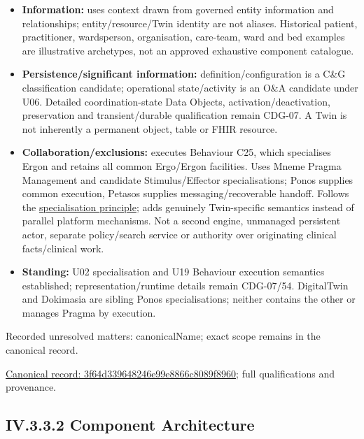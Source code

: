 \begin{itemize}
\item \textbf{Information:} uses context drawn from governed entity information and
  relationships; entity/resource/Twin identity are not aliases. Historical patient,
  practitioner, wardsperson, organisation, care-team, ward and bed examples are
  illustrative archetypes, not an approved exhaustive component catalogue.

\item \textbf{Persistence/significant information:} definition/configuration is a C\&G
  classification candidate; operational state/activity is an O\&A candidate under
  U06. Detailed coordination-state Data Objects, activation/deactivation,
  preservation and transient/durable qualification remain CDG-07. A Twin is not
  inherently a permanent object, table or FHIR resource.

\item \textbf{Collaboration/exclusions:} executes Behaviour C25, which specialises Ergon
  and retains all common Ergo/Ergon facilities. Uses Mneme Pragma Management and
  candidate Stimulus/Effector specialisations; Ponos supplies common execution,
  Petasos supplies messaging/recoverable handoff. Follows the
  \href{\detokenize{../../../../../docs/markdown/05-information-systems-architecture/README.md#specialisation-principle}}{specialisation principle}; adds genuinely
  Twin-specific semantics instead of parallel platform mechanisms.
  Not a second engine, unmanaged persistent actor, separate
  policy/search service or authority over originating clinical facts/clinical work.

\item \textbf{Standing:} U02 specialisation and U19 Behaviour execution semantics established;
  representation/runtime details remain CDG-07/54. DigitalTwin and Dokimasia are sibling
  Ponos specialisations; neither contains the other or manages Pragma by execution.

\end{itemize}

{\small Recorded unresolved matters: canonicalName; exact scope remains in the canonical record.}\par
{\footnotesize \href{../../../../continuum/application/application-component/3f64d339648246e99e8866c8089f8960.md}{Canonical record: 3f64d339648246e99e8866c8089f8960}; full qualifications and provenance.}\par
\subsection*{IV.3.3.2 Component Architecture}
\label{navigation:IV.3.3.2}

